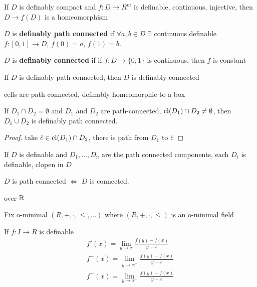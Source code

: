 \documentclass[11pt]{article}
\begin{document}
\begin{theorem}[]
If \(D\) is definably compact and \(f:D\to R^m\) is definable, continuous, injective,
then \(D\to f(D)\) is a homeomorphism
\end{theorem}

\begin{definition}[]
\(D\) is \textbf{definably path connected} if \(\forall a,b\in D\) \(\exists\) continuous
definable \(f:[0,1]\to D\), \(f(0)=a\), \(f(1)=b\).

\(D\) is \textbf{definably connected} if if \(f:D\to\{0,1\}\) is continuous, then \(f\) is constant
\end{definition}

\begin{remark}
If \(D\) is definably path connected, then \(D\) is definably connected

cells are path connected, definably homeomorphic to a box
\end{remark}

\begin{lemma}[]
If \(D_1\cap D_2=\emptyset\) and \(D_1\) and \(D_2\) are path-connected, \(\operatorname{\text{cl}}(D_1)\cap D_2\neq\emptyset\), then \(D_1\cup D_2\) is
definably path connected.
\end{lemma}

\begin{proof}
take \(\barc\in\cl(D_1)\cap D_2\), there is path from \(D_1\) to \(\barc\)
\end{proof}

\begin{lemma}[]
If \(D\) is definable and \(D_1,\dots,D_n\) are the path connected components, each \(D_i\) is
definable, clopen in \(D\)
\end{lemma}

\begin{corollary}[]
\(D\) is path connected \(\Leftrightarrow\) \(D\) is connected.
\end{corollary}

over \(\mathbb{R}\)

Fix o-minimal \((R,+,\cdot,\le,\dots)\) where \((R,+,\cdot,\le)\) is an o-minimal field

If \(f:I\to R\) is definable
\begin{gather*}
f'(x)=\lim_{y\to x}\frac{f(y)-f(x)}{y-x}\\
f^+(x)=\lim_{y\to x^+}\frac{f(y)-f(x)}{y-x}\\
f^-(x)=\lim_{y\to x^-}\frac{f(y)-f(x)}{y-x}
\end{gather*}
\end{document}
